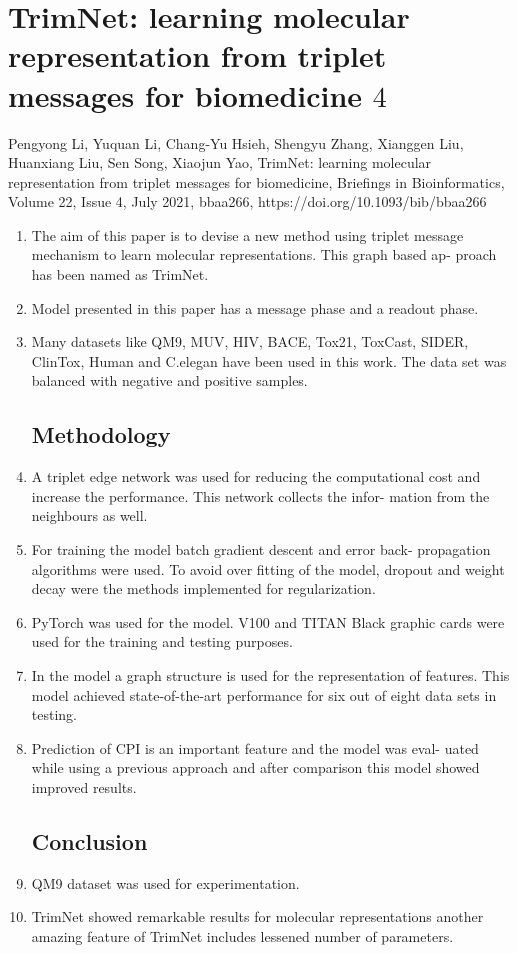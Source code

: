 \documentclass[]{report}
\begin{document}
\section{TrimNet: learning molecular representation from triplet messages for biomedicine $4$}
Pengyong Li, Yuquan Li, Chang-Yu Hsieh, Shengyu Zhang, Xianggen Liu, Huanxiang Liu, Sen Song, Xiaojun Yao, TrimNet: learning molecular representation from triplet messages for biomedicine, Briefings in Bioinformatics, Volume 22, Issue 4, July 2021, bbaa266, https://doi.org/10.1093/bib/bbaa266
\begin{enumerate}
\subsection{Introduction}
	\item The aim of this paper is to devise a new method using triplet message
	mechanism to learn molecular representations. This graph based ap-
	proach has been named as TrimNet.
	\item Model presented in this paper has a message phase and a readout phase.
	\item Many datasets like QM9, MUV, HIV, BACE, Tox21, ToxCast, SIDER,
	ClinTox, Human and C.elegan have been used in this work. The
	data set was balanced with negative and positive samples.
	\subsection{Methodology}
	\item A triplet edge network was used for reducing the computational
	cost and increase the performance. This network collects the infor-
	mation from the neighbours as well.
	\item For training the model batch gradient descent and error back-
	propagation algorithms were used. To avoid over fitting of the
	model, dropout and weight decay were the methods implemented
	for regularization.
	\item PyTorch was used for the model. V100 and TITAN Black graphic
	cards were used for the training and testing purposes.
	\item In the model a graph structure is used for the representation of
	features. This model achieved state-of-the-art performance for six
	out of eight data sets in testing.
	\item Prediction of CPI is an important feature and the model was eval-
	uated while using a previous approach and after comparison this
	model showed improved results.
	\subsection{Conclusion}
	\item QM9 dataset was used for experimentation.
	\item TrimNet showed remarkable results for molecular representations
	another amazing feature of TrimNet includes lessened number of
	parameters.
\end{enumerate}
\end{document}

